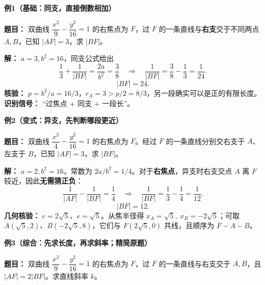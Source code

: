 \clearpage
\begin{examplebox}
  \textbf{\textcolor{CExample}{例1（基础：同支，直接倒数相加）}}

  \textbf{题目：} 双曲线 $\dfrac{x^2}{9}-\dfrac{y^2}{16}=1$ 的右焦点为 $F$，过 $F$ 的一条直线与\textbf{右支}交于不同两点 $A,B$，已知 $|AF|=3$，求 $|BF|$。

  \textbf{解：} $a=3,b^2=16$，同支公式给出
  \[
    \frac13+\frac1{|BF|}=\frac{2a}{b^2}=\frac38
    \quad\Longrightarrow\quad
    \frac1{|BF|}=\frac38-\frac13=\frac1{24}.
  \]
  \[
    \boxed{|BF|=24}.
  \]
  \textbf{核验：} $p=b^2/a=16/3$，$r_A=3>p/2=8/3$，另一段确实可以是正的有限长度。\textbf{识别信号：} “过焦点 + 同支 + 一段长”。

  \medskip
\end{examplebox}\clearpage\begin{examplebox}
  \textbf{\textcolor{CExample}{例2（变式：异支，先判断哪段更近）}}

  \textbf{题目：} 双曲线 $\dfrac{x^2}{4}-\dfrac{y^2}{16}=1$ 的右焦点为 $F$。经过 $F$ 的一条直线分别交右支于 $A$、左支于 $B$，已知 $|AF|=3$，求 $|BF|$。

  \textbf{解：} $a=2,b^2=16$，常数为 $2a/b^2=1/4$。对于\textbf{右焦点}，异支时右支交点 $A$ 离 $F$ 较近，因此\textbf{无需猜正负}：
  \[
    \frac1{|AF|}-\frac1{|BF|}=\frac14
    \quad\Longrightarrow\quad
    \frac1{|BF|}=\frac13-\frac14=\frac1{12}.
  \]
  \[
    \boxed{|BF|=12}.
  \]
  \textbf{几何核验：} $c=2\sqrt5$、$e=\sqrt5$。从焦半径得
  $x_A=\sqrt5,\ x_B=-2\sqrt5$；可取
  $A(\sqrt5,2)$、$B(-2\sqrt5,8)$，它们与 $F(2\sqrt5,0)$ 共线，且顺序为 $F-A-B$。

  \medskip
\end{examplebox}\clearpage\begin{examplebox}
  \textbf{\textcolor{CExample}{例3（综合：先求长度，再求斜率；精简原题）}}

  \textbf{题目：} 双曲线 $\dfrac{x^2}{9}-\dfrac{y^2}{16}=1$ 的右焦点为 $F$，过 $F$ 的一条直线与右支交于 $A,B$，且 $|AF|=2|BF|$。求直线斜率 $k$。


\end{examplebox}
